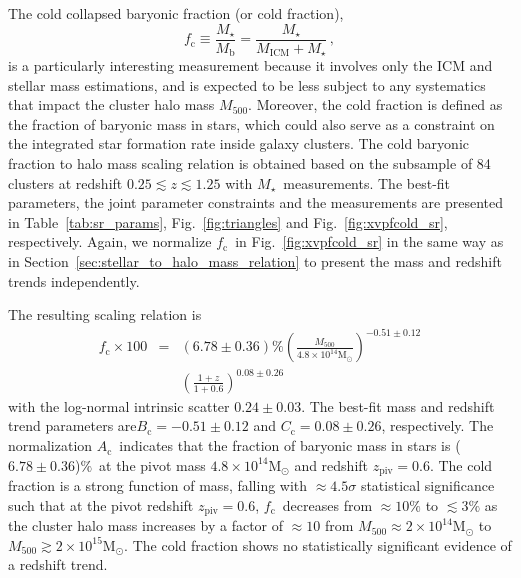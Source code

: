 \documentclass[useAMS,usenatbib,iop,numberedappendix]{mn2e}
\newcommand{\Msun}{\ensuremath{\mathrm{M}_{\odot}}}
\newcommand{\Mfiveoo}{\ensuremath{M_{500}}}
\newcommand{\redshift}{\ensuremath{z}}
\newcommand{\Mstar}{\ensuremath{M_{\star}}}
\newcommand{\Mgas}{\ensuremath{M_{\mathrm{ICM}}}}
\newcommand{\Mbary}{\ensuremath{M_{\mathrm{b}}}}
\newcommand{\ZPIV}{\ensuremath{z_{\mathrm{piv}}}}
\newcommand{\Acold}{\ensuremath{A_{\mathrm{c}}}}
\newcommand{\Bcold}{\ensuremath{B_{\mathrm{c}}}}
\newcommand{\Ccold}{\ensuremath{C_{\mathrm{c}}}}
\newcommand{\fcold}{\ensuremath{f_{\mathrm{c}}}}
\newcommand{\percent}{\ensuremath{\%}}
\newcommand{\numDcoldonez}{\ensuremath{0.24\pm0.03}}
\newcommand{\numAcoldonezsys}{\ensuremath{6.78\pm0.36}}
\newcommand{\numBcoldonezsys}{\ensuremath{-0.51\pm0.12}}
\newcommand{\numCcoldonezsys}{\ensuremath{0.08\pm0.26}}
\begin{document}
The cold collapsed baryonic fraction (or cold fraction),
\[
\fcold \equiv \frac{\Mstar}{\Mbary} = \frac{\Mstar}{\Mgas + \Mstar} \, ,
\]
is a particularly interesting measurement because it involves only the ICM and stellar mass estimations, and is expected to be less subject to any systematics that impact the cluster halo mass \Mfiveoo.
Moreover, the cold fraction is defined as the fraction of baryonic mass in stars, which could also serve as a constraint on the integrated star formation rate inside galaxy clusters.
The cold baryonic fraction to halo mass scaling relation is obtained based on the subsample of 84 clusters at redshift $0.25\lesssim\redshift\lesssim1.25$ with \Mstar\ measurements.
The best-fit parameters,  the joint parameter constraints and the measurements are presented in Table~\ref{tab:sr_params}, Fig.~\ref{fig:triangles} and Fig.~\ref{fig:xvpfcold_sr}, respectively.
Again, we normalize \fcold\ in Fig.~\ref{fig:xvpfcold_sr} in the same way as in Section~\ref{sec:stellar_to_halo_mass_relation} to present the mass and redshift trends independently.

The resulting scaling relation is
%
\begin{eqnarray}
\label{eq:fcold_sr_oneplusz}
\fcold \times100 &=& \left(\numAcoldonezsys \right)\percent
\left( \frac{\Mfiveoo}{4.8\times10^{14}\Msun} \right)^{\numBcoldonezsys}  \nonumber \\
&&\left( \frac{1 + \redshift}{1 + 0.6} \right)^{\numCcoldonezsys} \, 
\end{eqnarray}
%
with the log-normal intrinsic scatter $\numDcoldonez$.
The best-fit mass and redshift trend parameters are$\Bcold = \numBcoldonezsys$ and $\Ccold = \numCcoldonezsys$, respectively.
The normalization \Acold\ indicates that the fraction of baryonic mass in stars is (\numAcoldonezsys)\percent\ at the pivot mass $4.8\times10^{14}\Msun$ and redshift $\ZPIV = 0.6$. 
The cold fraction is a strong function of mass, falling with $\approx4.5\sigma$ statistical significance such that at the pivot redshift $\ZPIV = 0.6$, \fcold\ decreases from 
$\approx10\percent$ to $\lesssim3\percent$ as the cluster halo mass increases by a factor of $\approx10$ from $\Mfiveoo\approx2\times10^{14}\Msun$ to $\Mfiveoo\gtrsim2\times10^{15}\Msun$.
The cold fraction shows no statistically significant evidence of a redshift trend.
\end{document}
